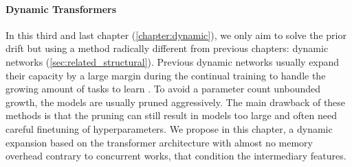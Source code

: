 \paragraph{Dynamic Transformers} In this third and last chapter (\autoref{chapter:dynamic}), we only
aim to solve the prior drift but using a method radically different from previous chapters: dynamic
networks (\autoref{sec:related_structural}). Previous dynamic networks usually expand their capacity
by a large margin during the continual training to handle the growing amount of tasks to learn
\citep{yan2021der}. To avoid a parameter count unbounded growth, the models are usually pruned
aggressively. The main drawback of these methods is that the pruning can still result in models too
large and often need careful finetuning of hyperparameters. We propose in this chapter, a dynamic
expansion based on the transformer architecture with almost no memory overhead contrary to
concurrent works, that condition \citep{perez2018film} the intermediary features.
